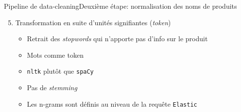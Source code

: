 \documentclass[ignorenonframetext,]{beamer}
\begin{document}
\begin{frame}{Pipeline de data-cleaning}{Deuxième étape: normalisation des noms de produits}

\begin{enumerate}
\setcounter{enumi}{4}
\item Transformation en suite d'unités signifiantes (\textit{token})
\begin{itemize}
    \item Retrait des \textit{stopwords} qui n'apporte pas d'info sur le produit 
    \item Mots comme token
    \item \texttt{nltk} plutôt que \texttt{spaCy}
    \item Pas de \textit{stemming}
    \item Les n-grams sont définis au niveau de la requête \texttt{Elastic}
\end{itemize}
\end{enumerate}

\begin{center}
\end{center}

\end{frame}
\end{document}
